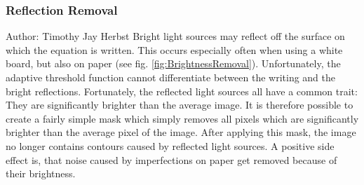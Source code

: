 \documentclass[12pt]{article}
\begin{document}
	\subsubsection{Reflection Removal}
	\small{Author: Timothy Jay Herbst} \newline \newline
	Bright light sources may reflect off the surface on which the equation is written.
	This occurs especially often when using a white board, but also on paper (see fig. \ref{fig:BrightnessRemoval}).
	Unfortunately, the adaptive threshold function cannot differentiate between the writing and the bright reflections.
	Fortunately, the reflected light sources all have a common trait:
	They are significantly brighter than the average image.
	It is therefore possible to create a fairly simple mask which simply removes all pixels which are significantly brighter than the average pixel of the image.
	After applying this mask, the image no longer contains contours caused by reflected light sources.%
	A positive side effect is, that noise caused by imperfections on paper get removed because of their brightness.
	
\end{document}
